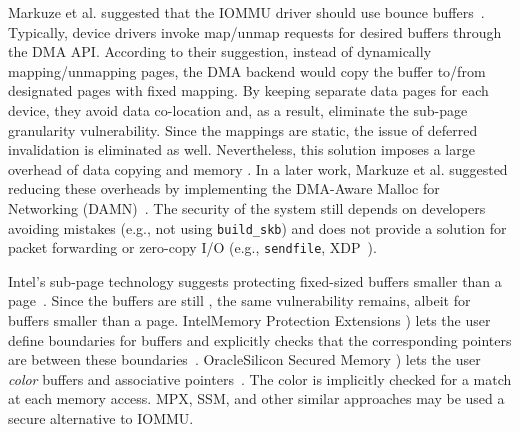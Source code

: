 Markuze et al. suggested that the IOMMU driver should use bounce buffers~\cite{MMT16}. Typically, device drivers invoke map/unmap requests for desired buffers through the DMA API. According to their suggestion, instead of dynamically mapping/unmapping pages, the DMA backend would copy the buffer to/from designated pages with fixed mapping. By keeping separate data pages for each device, they avoid data co-location and, as a result, eliminate the sub-page granularity vulnerability. Since the mappings are static, the issue of deferred invalidation is eliminated as well. 
%
Nevertheless, this solution imposes a large overhead of data copying and memory \DIFdelbegin {}\DIFdelend \DIFaddbegin {}\DIFaddend . In a later work, Markuze et al. suggested reducing these overheads by implementing the DMA-Aware Malloc for Networking (DAMN)~\cite{MSMT18}. The security of the system still depends on developers avoiding mistakes (e.g., not using \texttt{build\_skb}) and does not provide a solution for packet forwarding or zero-copy I/O (e.g., \texttt{sendfile}, XDP~\cite{xdp}). %

Intel’s sub-page \DIFdelbegin {}\DIFdelend \DIFaddbegin {}\DIFaddend technology suggests protecting fixed-sized buffers smaller than a page~\cite{Int18}. Since the buffers are still \DIFdelbegin {}\DIFdelend \DIFaddbegin {}\DIFaddend , the same vulnerability remains, albeit for buffers smaller than a page. Intel\DIFdelbegin {}\DIFdelend \DIFaddbegin {}\DIFaddend Memory Protection Extensions \DIFaddbegin {}\DIFaddend ) lets the user define boundaries for buffers and \DIFdelbegin {}\DIFdelend \DIFaddbegin {}\DIFaddend explicitly checks that the corresponding pointers are between these boundaries~\cite{Int16a}. Oracle\DIFdelbegin {}\DIFdelend \DIFaddbegin {}\DIFaddend Silicon Secured Memory \DIFaddbegin {}\DIFaddend ) lets the user \emph{color} buffers and associative pointers~\cite{Ora15}. The color is implicitly checked for a match at each memory access. MPX, SSM, and other similar approaches may be used \DIFdelbegin {}\DIFdelend \DIFaddbegin {}\DIFaddend a secure alternative to IOMMU. 

